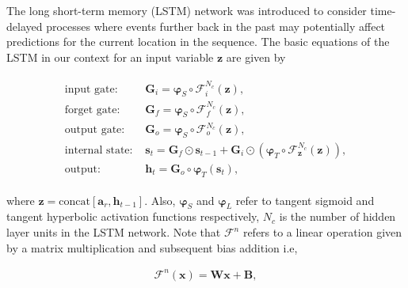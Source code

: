 \documentclass[preprint,12pt]{elsarticle}
\begin{document}
The long short-term memory (LSTM) network was introduced to consider time-delayed processes where events further back in the past may potentially affect predictions for the current location in the sequence. The basic equations of the LSTM in our context for an input variable $\mathbf{z}$ are given by
\begin{linenomath*}
\begin{align}
\begin{split}
\text{input gate: }& \boldsymbol{G}_{i}=\boldsymbol{\varphi}_{S} \circ \mathcal{F}_{i}^{N_{c}}(\mathbf{z}), \\
\text{forget gate: }& \boldsymbol{G}_{f}=\boldsymbol{\varphi}_{S} \circ \mathcal{F}_{f}^{N_{c}}(\mathbf{z}), \\
\text{output gate: }& \boldsymbol{G}_{o}=\boldsymbol{\varphi}_{S} \circ \mathcal{F}_{o}^{N_{c}}(\mathbf{z}), \\
\text{internal state: }& \boldsymbol{s}_{t}=\boldsymbol{G}_{f} \odot \boldsymbol{s}_{t-1}+\boldsymbol{G}_{i} \odot\left(\boldsymbol{\varphi}_{T} \circ \mathcal{F}_{\mathbf{z}}^{N_{c}}(\mathbf{z})\right), \\
\text{output: }& \mathbf{h}_t = \boldsymbol{G}_{o} \circ \boldsymbol{\varphi}_{T}\left(\boldsymbol{s}_{t}\right),
\end{split}
\end{align}
\end{linenomath*}
where $\mathbf{z} = \text{concat}[\mathbf{a}_r,\mathbf{h}_{t-1}]$. Also, $\boldsymbol{\varphi}_{S}$ and $\boldsymbol{\varphi}_{L}$ refer to tangent sigmoid and tangent hyperbolic activation functions respectively, $N_c$ is the number of hidden layer units in the LSTM network. Note that $\mathcal{F}^{n}$ refers to a linear operation given by a matrix multiplication and subsequent bias addition i.e,
\begin{linenomath*}
\begin{align}
\mathcal{F}^{n}(\boldsymbol{x})=\boldsymbol{W} \boldsymbol{x}+\boldsymbol{B},
\end{align}
\end{linenomath*}
\end{document}

